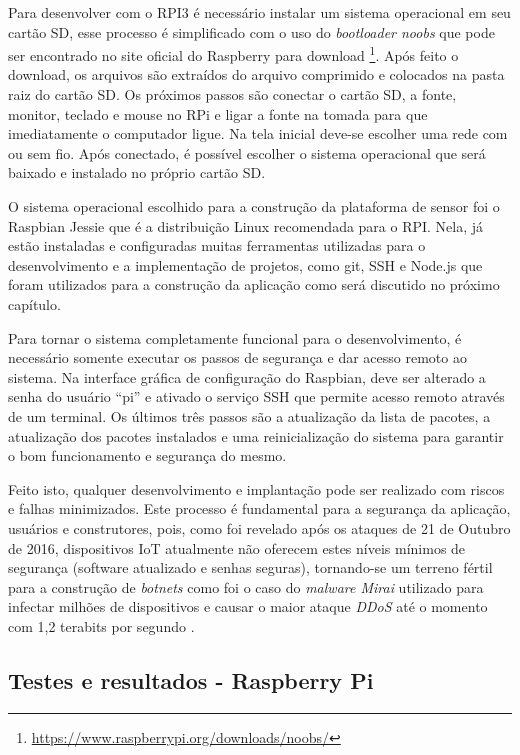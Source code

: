 Para desenvolver com o RPI3 é necessário instalar um sistema operacional
em seu cartão SD, esse processo é simplificado com o uso do \emph{bootloader noobs}
que pode ser encontrado no site oficial do Raspberry para download \footnote{\url{https://www.raspberrypi.org/downloads/noobs/}}. Após
feito o download, os arquivos são extraídos do arquivo comprimido e colocados na
pasta raiz do cartão SD. Os próximos passos são conectar o cartão SD, a fonte,
monitor, teclado e mouse no RPi e ligar a fonte na tomada
para que imediatamente o computador ligue. Na tela inicial deve-se escolher uma rede com ou sem fio.
Após conectado, é possível escolher o sistema operacional que será baixado e instalado no próprio cartão SD.

O sistema operacional escolhido para a construção da plataforma de sensor foi o
Raspbian Jessie que é a distribuição Linux recomendada para o RPI. Nela, já estão
instaladas e configuradas muitas ferramentas utilizadas para o desenvolvimento e
	a implementação de projetos, como git, SSH e Node.js que foram utilizados para a
construção da aplicação como será discutido no próximo capítulo.

Para tornar o sistema completamente funcional para o desenvolvimento, é
necessário somente executar os passos de segurança e dar acesso remoto
ao sistema. Na interface gráfica de configuração do Raspbian, deve ser alterado
a senha do usuário ``pi'' e ativado o serviço SSH que permite acesso remoto através
de um terminal. Os últimos três passos são a atualização da lista de pacotes,
a atualização dos pacotes instalados e uma reinicialização do sistema para
garantir o bom funcionamento e segurança do mesmo.

Feito isto, qualquer desenvolvimento e implantação pode ser realizado com riscos
e falhas minimizados. Este processo é fundamental para a segurança da aplicação,
usuários e construtores, pois, como foi revelado após os ataques de 21 de Outubro
de 2016, dispositivos IoT atualmente não oferecem estes níveis mínimos de
segurança (software atualizado e senhas seguras), tornando-se um terreno
fértil para a construção de \emph{botnets} como foi o caso do \emph{malware
Mirai} utilizado para infectar milhões de dispositivos e causar o maior ataque
\emph{DDoS} até o momento com 1,2 terabits por segundo
\cite{guardianMirai} \cite{nytimesMirai}.


\subsection{Testes e resultados - Raspberry Pi}
\label{subsec:testes-rpi}

